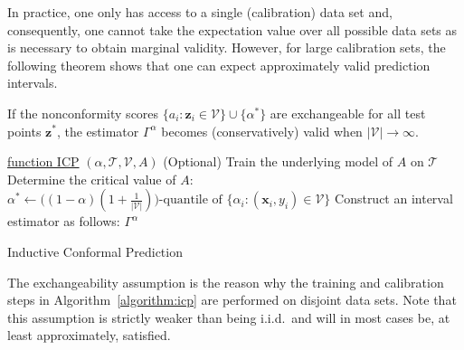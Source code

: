 \documentclass[smallcondensed]{svjour3}
\let\oldnl\nl%
\newcommand{\nonl}{\renewcommand{\nl}{\let\nl\oldnl}}%
\begin{document}
    In practice, one only has access to a single (calibration) data set and, consequently, one cannot take the expectation value over all possible data sets as is necessary to obtain marginal validity. However, for large calibration sets, the following theorem shows that one can expect approximately valid prediction intervals.
    \begin{theorem*}
        If the nonconformity scores $\{a_i:\mathbf{z}_i\in\mathcal{V}\}\cup\{\alpha^*\}$ are exchangeable for all test points $\mathbf{z}^*$, the estimator $\Gamma^\alpha$ becomes (conservatively) valid when $|\mathcal{V}|\rightarrow\infty$.
    \end{theorem*}

    \begin{algorithm}[t!]

        \nonl\underline{function ICP} $(\alpha,\mathcal{T},\mathcal{V},A)$\;
        (Optional) Train the underlying model of $A$ on $\mathcal{T}$\;
        Determine the critical value of $A$: $\alpha^*\leftarrow\big((1-\alpha)(1 + \frac{1}{|\mathcal{V}|})\big)\text{-quantile of }\{\alpha_i:(\mathbf{x}_i,y_i)\in\mathcal{V}\}$\;
        Construct an interval estimator as follows:\;
        \nonl\SetAlgoNoLine{}\nonl\;
        \KwRet$\Gamma^\alpha$
        \caption{Inductive Conformal Prediction}
        \label{algorithm:icp}
    \end{algorithm}

    The exchangeability assumption \cite{cp_all} is the reason why the training and calibration steps in Algorithm~\ref{algorithm:icp} are performed on disjoint data sets. Note that this assumption is strictly weaker than being i.i.d.\ and will in most cases be, at least approximately, satisfied.
\end{document}
